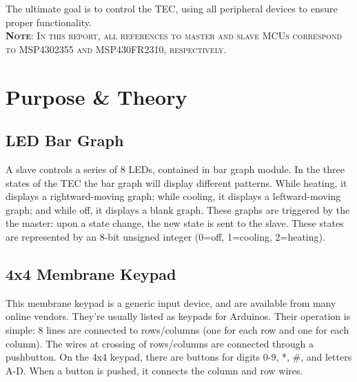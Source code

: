 \documentclass{article}
\begin{document}
\noindent The ultimate goal is to control the TEC, using all peripheral devices to ensure proper functionality.\\

\noindent \textsc{\textbf{Note}: In this report, all references to master and slave MCUs correspond to MSP4302355 and MSP430FR2310, respectively.}\\



\section{Purpose \& Theory}
\label{sec:PurposeTheory}


\subsection{LED Bar Graph}
\label{sec:LEDBarGraph}

A slave controls a series of 8 LEDs, contained in bar graph module. In the three states of the TEC the bar graph will display different patterns. While heating, it displays a rightward-moving graph; while cooling, it displays a leftward-moving graph; and while off, it displays a blank graph. These graphs are triggered by the the master: upon a state change, the new state is sent to the slave. These states are represented by an 8-bit unsigned integer (0=off, 1=cooling, 2=heating).\\


\subsection{4x4 Membrane Keypad}
\label{sec:MembraneKeypad}

This membrane keypad is a generic input device, and are available from many online vendors. They're usually listed as keypads for Arduinos. Their operation is simple: 8 lines are connected to rows/columns (one for each row and one for each column). The wires at crossing of rows/columns are connected through a pushbutton. On the 4x4 keypad, there are buttons for digits 0-9, *, \#, and letters A-D. When a button is pushed, it connects the column and row wires.\\
\end{document}
